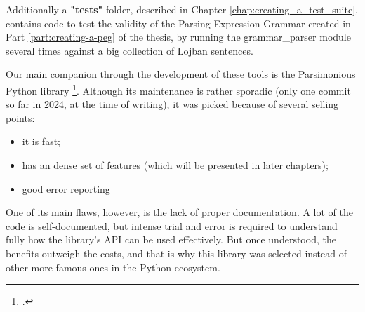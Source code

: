 Additionally a \textbf{"tests"} folder, described in Chapter \ref{chap:creating_a_test_suite}, contains code to
test the validity of the Parsing Expression Grammar created in Part \ref{part:creating-a-peg} of the thesis, by
running the grammar\_parser module several times against a big collection of Lojban sentences.\newline

Our main companion through the development of these tools is the Parsimonious Python library \footcite{parsimonious}.
Although its maintenance is rather sporadic (only one commit so far in 2024, at the time of writing), it was picked because of
several selling points:

\begin{itemize}
\item it is fast;
\item has an dense set of features (which will be presented in later chapters);
\item good error reporting
\end{itemize}

One of its main flaws, however, is the lack of proper documentation. A lot of the code is self-documented, but intense
trial and error is required to understand fully how the library's API can be used effectively. But once understood, the
benefits outweigh the costs, and that is why this library was selected instead of other more famous ones in the Python ecosystem.